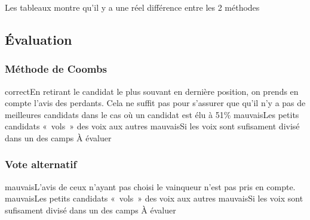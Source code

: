 \documentclass[../report]{subfiles}
\begin{document}
  Les tableaux  montre qu'il y a une réel différence entre les 2 méthodes

  \subsection{Évaluation}
  \subsubsection{Méthode de Coombs}
  \tabcritere%
    {correct}{En retirant le candidat le plus souvant en dernière position, on prends en compte l'avis des perdants. Cela ne suffit pas pour s'assurer que qu'il n'y a pas de meilleures candidats dans le cas où un candidat est élu à 51\%}%
    {mauvais}{Les petits candidats «~vols~» des voix aux autres}%
    {mauvais}{Si les voix sont sufisament divisé dans un des camps}%
    {À évaluer}{}
  \subsubsection{Vote alternatif}
  \tabcritere%
    {mauvais}{L'avis de ceux n'ayant pas choisi le vainqueur n'est pas pris en compte.}%
    {mauvais}{Les petits candidats «~vols~» des voix aux autres}%
    {mauvais}{Si les voix sont sufisament divisé dans un des camps}%
    {À évaluer}{}


  
\end{document}
